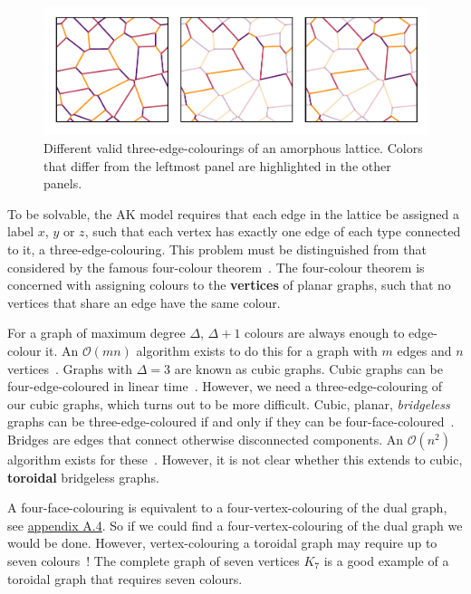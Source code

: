 \hypertarget{fig:multiple_colourings}{%
\begin{figure}
\centering
\includegraphics[width=1\textwidth,height=\textheight]{figure_code/amk_chapter/multiple_colourings/multiple_colourings}
\caption[{Colourings of an Amorphous Lattice}]{Different valid three-edge-colourings of an amorphous lattice. Colors that differ from the leftmost panel are highlighted in the other panels.}
\label{fig:multiple_colourings}
\end{figure}
}

To be solvable, the AK model requires that each edge in the lattice be assigned a label \(x\), \(y\) or \(z\), such that each vertex has exactly one edge of each type connected to it, a three-edge-colouring. This problem must be distinguished from that considered by the famous four-colour theorem~\autocite{appelEveryPlanarMap1989}. The four-colour theorem is concerned with assigning colours to the \textbf{vertices} of planar graphs, such that no vertices that share an edge have the same colour.

For a graph of maximum degree \(\Delta\), \(\Delta + 1\) colours are always enough to edge-colour it. An \(\mathcal{O}(mn)\) algorithm exists to do this for a graph with \(m\) edges and \(n\) vertices~\autocite{gEstimateChromaticClass1964}. Graphs with \(\Delta = 3\) are known as cubic graphs. Cubic graphs can be four-edge-coloured in linear time~\autocite{skulrattanakulchai4edgecoloringGraphsMaximum2002}. However, we need a three-edge-colouring of our cubic graphs, which turns out to be more difficult. Cubic, planar, \emph{bridgeless} graphs can be three-edge-coloured if and only if they can be four-face-coloured~\autocite{tait1880remarks}. Bridges are edges that connect otherwise disconnected components. An \(\mathcal{O}(n^2)\) algorithm exists for these~\autocite{robertson1996efficiently}. However, it is not clear whether this extends to cubic, \textbf{toroidal} bridgeless graphs.

A four-face-colouring is equivalent to a four-vertex-colouring of the dual graph, see \protect\hyperlink{app-lattice-generation}{appendix A.4}. So if we could find a four-vertex-colouring of the dual graph we would be done. However, vertex-colouring a toroidal graph may require up to seven colours~\autocite{heawoodMapColouringTheorems}! The complete graph of seven vertices \(K_7\) is a good example of a toroidal graph that requires seven colours.

